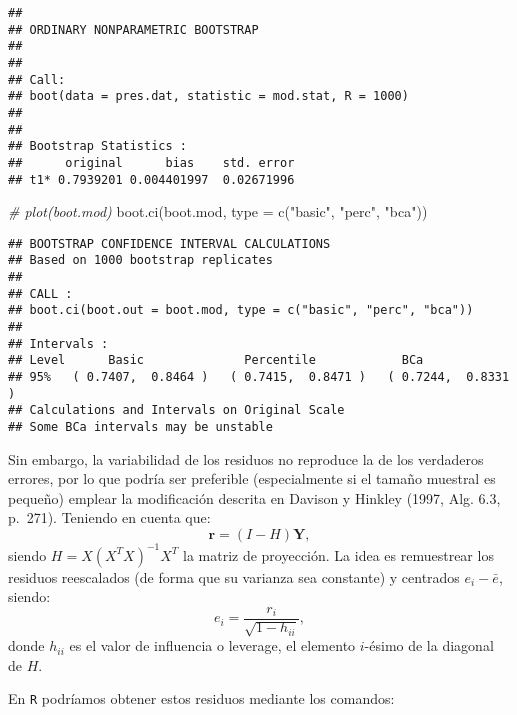 \documentclass[
]{book}
\newenvironment{Shaded}{\begin{snugshade}}{\end{snugshade}}
\newcommand{\AttributeTok}[1]{\textcolor[rgb]{0.77,0.63,0.00}{#1}}
\newcommand{\CommentTok}[1]{\textcolor[rgb]{0.56,0.35,0.01}{\textit{#1}}}
\newcommand{\DecValTok}[1]{\textcolor[rgb]{0.00,0.00,0.81}{#1}}
\newcommand{\FunctionTok}[1]{\textcolor[rgb]{0.00,0.00,0.00}{#1}}
\newcommand{\NormalTok}[1]{#1}
\newcommand{\OtherTok}[1]{\textcolor[rgb]{0.56,0.35,0.01}{#1}}
\newcommand{\SpecialCharTok}[1]{\textcolor[rgb]{0.00,0.00,0.00}{#1}}
\newcommand{\StringTok}[1]{\textcolor[rgb]{0.31,0.60,0.02}{#1}}
\theoremstyle{break}
\theoremstyle{definition}
\theoremstyle{definition}
\theoremstyle{definition}
\theoremstyle{definition}
\theoremstyle{remark}
\begin{document}
\begin{verbatim}
## 
## ORDINARY NONPARAMETRIC BOOTSTRAP
## 
## 
## Call:
## boot(data = pres.dat, statistic = mod.stat, R = 1000)
## 
## 
## Bootstrap Statistics :
##      original      bias    std. error
## t1* 0.7939201 0.004401997  0.02671996
\end{verbatim}

\begin{Shaded}
\begin{Highlighting}[]
\CommentTok{\# plot(boot.mod)}
\FunctionTok{boot.ci}\NormalTok{(boot.mod, }\AttributeTok{type =} \FunctionTok{c}\NormalTok{(}\StringTok{"basic"}\NormalTok{, }\StringTok{"perc"}\NormalTok{, }\StringTok{"bca"}\NormalTok{))}
\end{Highlighting}
\end{Shaded}

\begin{verbatim}
## BOOTSTRAP CONFIDENCE INTERVAL CALCULATIONS
## Based on 1000 bootstrap replicates
## 
## CALL : 
## boot.ci(boot.out = boot.mod, type = c("basic", "perc", "bca"))
## 
## Intervals : 
## Level      Basic              Percentile            BCa          
## 95%   ( 0.7407,  0.8464 )   ( 0.7415,  0.8471 )   ( 0.7244,  0.8331 )  
## Calculations and Intervals on Original Scale
## Some BCa intervals may be unstable
\end{verbatim}

Sin embargo, la variabilidad de los residuos no reproduce la de los verdaderos errores, por lo que podría ser preferible (especialmente si el tamaño muestral es pequeño) emplear la modificación descrita en Davison y Hinkley (1997, Alg. 6.3, p.~271).
Teniendo en cuenta que:
\[\mathbf{r} = \left( I - H \right)\mathbf{Y},\]
siendo \(H = X\left( X^{T}X\right)^{-1}X^{T}\) la matriz de proyección.
La idea es remuestrear los residuos reescalados (de forma que su varianza sea constante) y centrados \(e_i - \bar{e}\), siendo:
\[e_i = \frac{r_i}{\sqrt{1 - h_{ii}}},\]
donde \(h_{ii}\) es el valor de influencia o leverage, el elemento \(i\)-ésimo de la diagonal de \(H\).

En \texttt{R} podríamos obtener estos residuos mediante los comandos:

\begin{Shaded}
\end{Shaded}
\end{document}
